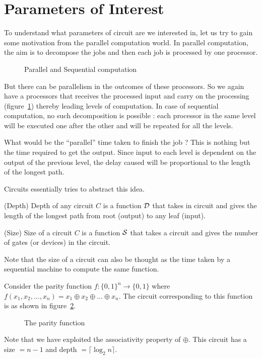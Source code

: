 \section{Parameters of Interest}
To understand what parameters of circuit are we interested in, let us try
to gain some motivation from the parallel computation world. In parallel
computation, the aim is to decompose the jobs and then each job is processed
by one processor. 
\begin{figure}[htp!]
\centering

\caption{Parallel and Sequential computation}
\label{figure1}
\end{figure}

But there can be parallelism in the outcomes of these processors. So we again
have a processors that receives the processed input and carry on the
processing (figure~\ref{figure1}) thereby leading levels of computation. 
In case of sequential computation, no such decomposition is possible : 
each processor in the same level will be executed one after the other and will 
be repeated for all the levels.

What would be the ``parallel'' time taken to finish the job ? This is nothing
but the time required to get the output. Since input to each level is
dependent on the output of the previous level, the delay caused will be
proportional to the length of the longest path.

Circuits essentially tries to abstract this idea.
\begin{definition}(Depth) Depth of any circuit $C$ is a function ${\cal D}$ that
takes in circuit and gives the length of the longest path from root 
(output) to any leaf (input).
\end{definition}

\begin{definition}(Size) Size of a circuit $C$ is a function ${\cal S}$ 
that takes a circuit and gives the number of gates (or devices) in the circuit.

Note that the size of a circuit can also be thought as the time taken by a
sequential machine to compute the same function.
\end{definition}

\begin{example}
Consider the parity function $f : \{0,1\}^n \to \{0,1\}$ where
$f(x_1,x_2,\ldots,x_n) = x_1 \oplus x_2 \oplus \ldots \oplus x_n$. The
circuit corresponding to this function is as shown in figure~\ref{figure2}.

\begin{figure}[htp!]
\centering

\caption{The parity function}
\label{figure2}
\end{figure}
Note that we have exploited the associativity property of $\oplus$.
This circuit has a size $= n-1$ and depth $=\lceil\log_2 n \rceil$.
\end{example}

